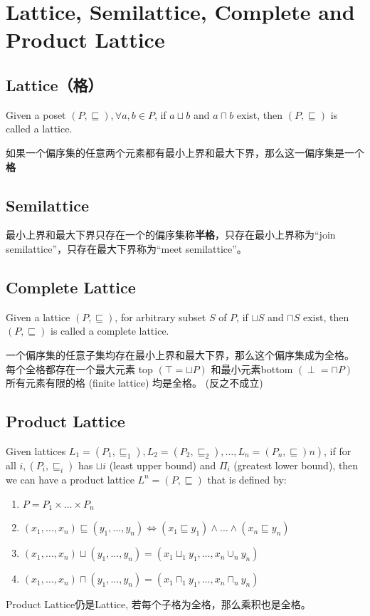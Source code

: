 \documentclass[a4paper]{article}
\theoremstyle{definition}
\begin{document}
\section{Lattice, Semilattice, Complete and Product Lattice}
\subsection{Lattice（格）}
Given a poset $(P, \sqsubseteq), \forall a, b \in P$, if $a \sqcup b$ and $a \sqcap b$ exist, then $(P, \sqsubseteq)$ is called a lattice.

如果一个偏序集的任意两个元素都有最小上界和最大下界，那么这一偏序集是一个\textbf{格}

\subsection{Semilattice}
最小上界和最大下界只存在一个的偏序集称\textbf{半格}，只存在最小上界称为“join semilattice”，只存在最大下界称为“meet semilattice”。

\subsection{Complete Lattice}
Given a lattice $(P, \sqsubseteq)$, for arbitrary subset $S$ of $P$, if $\sqcup S$ and $\sqcap S$ exist, then $(P, \sqsubseteq)$ is
called a complete lattice.

一个偏序集的任意子集均存在最小上界和最大下界，那么这个偏序集成为全格。
每个全格都存在一个最大元素 top $(\top=\sqcup P)$ 和最小元素bottom $(\perp=\sqcap P)$
所有元素有限的格 (finite lattice) 均是全格。 (反之不成立)
\subsection{Product Lattice}
Given lattices $\left.L_{1}=\left(P_{1}, \sqsubseteq_{1}\right), L_{2}=\left(P_{2}, \sqsubseteq_{2}\right), \ldots, L_{n}=\left(P_{n}, \sqsubseteq\right) n\right)$, if for all $i,\left(P_{i}, \sqsubseteq_{i}\right)$
has $\sqcup i$ (least upper bound) and $\Pi_{i}$ (greatest lower bound), then we can have a product
lattice $L^{n}=(P, \sqsubseteq)$ that is defined by:
\begin{enumerate}
\item $P=P_{1} \times \ldots \times P_{n}$
\item $\left(x_{1}, \ldots, x_{n}\right) \sqsubseteq\left(y_{1}, \ldots, y_{n}\right) \Leftrightarrow\left(x_{1} \sqsubseteq y_{1}\right) \wedge \ldots \wedge\left(x_{n} \sqsubseteq y_{n}\right)$
\item $\left(x_{1}, \ldots, x_{n}\right) \sqcup\left(y_{1}, \ldots, y_{n}\right)=\left(x_{1} \sqcup_{1} y_{1}, \ldots, x_{n} \cup_{n} y_{n}\right)$
\item  $\left(x_{1}, \ldots, x_{n}\right) \sqcap\left(y_{1}, \ldots, y_{n}\right)=\left(x_{1} \sqcap_{1} y_{1}, \ldots, x_{n} \sqcap_{n} y_{n}\right)$
\end{enumerate}
Product Lattice仍是Lattice, 若每个子格为全格，那么乘积也是全格。
\end{document}
